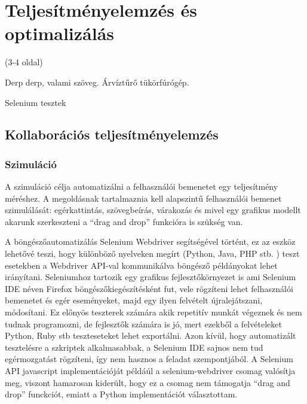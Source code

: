\chapter{Teljesítményelemzés és optimalizálás}

(3-4 oldal)

Derp derp, valami szöveg. Árvíztűrő tükörfúrógép.

Selenium tesztek


\section{Kollaborációs teljesítményelemzés}


\subsection{Szimuláció}
A szimuláció célja automatizálni a felhasználói bemenetet egy teljesítmény méréshez. A megoldásnak tartalmaznia kell alapszintű felhasználói bemenet szimulálását: egérkattintás, szövegbeírás, várakozás és mivel egy grafikus modellt akarunk szerkeszteni a ``drag and drop'' funkcióra is szükség van. 

A böngészőautomatizálás Selenium Webdriver segítségével történt, ez az eszköz lehetővé teszi, hogy különböző nyelveken megírt (Python, Java, PHP stb. ) teszt esetekben a Webdriver API-val kommunikálva böngésző példányokat lehet irányítani. 
Seleniumhoz tartozik egy grafikus fejlesztőkörnyezet is ami Selenium IDE néven Firefox böngészőkiegészítésként fut, vele rögzíteni lehet felhasználói bemenetet és egér eseményeket, majd egy ilyen felvételt újralejátszani, módosítani. Ez előnyös teszterek számára akik repetitív munkát végeznek és nem tudnak programozni, de fejlesztők számára is jó, mert ezekből a felvételeket Python, Ruby stb teszteseteket lehet exportálni. 
Azon kívül, hogy automatizált tesztelésre a szkriptek alkalmasabbak, a Selenium IDE sajnos nem tud egérmozgatást rögzíteni, így nem hasznos a feladat szempontjából. A Selenium API javascript implementációját példáúl a selenium-webdriver csomag valósítja meg, viszont hamarosan kiderült, hogy ez a csomag nem támogatja ``drag and drop'' funckciót, emiatt a Python implementációt választottam. 

